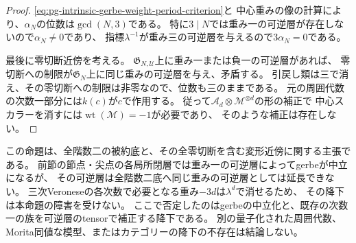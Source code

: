 \begin{proof}
\eqref{eq:pg-intrinsic-gerbe-weight-period-criterion}と
中心重みの像の計算により、$\alpha_N$の位数は$\gcd(N,3)$である。
特に$3\mid N$では重み一の可逆層が存在しないので$\alpha_N\ne0$であり、
指標$\lambda^{-1}$が重み三の可逆層を与えるので$3\alpha_N=0$である。

最後に零切断近傍を考える。
$\mathfrak G_{N,\mathcal U}$上に重み一または負一の可逆層があれば、
零切断への制限が$\mathfrak G_N$上に同じ重みの可逆層を与え、矛盾する。
引戻し類は三で消え、その零切断への制限は非零なので、位数も三のままである。
元の周囲代数の次数一部分には$k(c)$が$c$で作用する。
従って$\mathcal A_d\otimes\mathcal M^{\otimes d}$の形の補正で
中心スカラーを消すには$\operatorname{wt}(\mathcal M)=-1$が必要であり、
そのような補正は存在しない。
\end{proof}

\begin{remark}[障害の射程]
\label{rem:pg-intrinsic-gerbe-obstruction-scope}
この命題は、全階数二の被約底と、その全零切断を含む変形近傍に関する主張である。
前節の節点・尖点の各局所閉層では重み一の可逆層によってgerbeが中立になるが、
その可逆層は全階数二底へ同じ重みの可逆層としては延長できない。
三次Veroneseの各次数で必要となる重み$-3d$は$\lambda^d$で消せるため、
その降下は本命題の障害を受けない。
ここで否定したのはgerbeの中立化と、既存の次数一の族を可逆層のtensorで補正する降下である。
別の量子化された周囲代数、Morita同値な模型、またはカテゴリーの降下の不存在は結論しない。
\end{remark}

